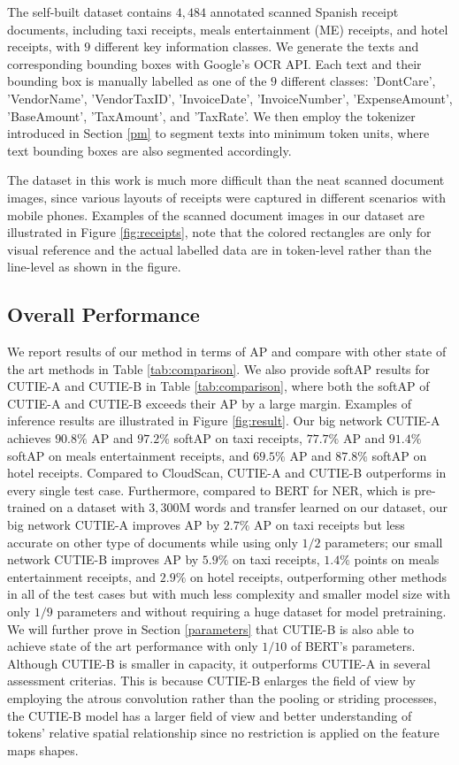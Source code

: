 \documentclass[10pt,twocolumn,letterpaper]{article}
\begin{document}
The self-built dataset contains $4,484$ annotated scanned Spanish receipt documents, including taxi receipts, meals entertainment (ME) receipts, and hotel receipts, with $9$ different key information classes. We generate the texts and corresponding bounding boxes with Google's OCR API. Each text and their bounding box is manually labelled as one of the $9$ different classes: 'DontCare', 'VendorName', 'VendorTaxID', 'InvoiceDate', 'InvoiceNumber', 'ExpenseAmount', 'BaseAmount', 'TaxAmount', and 'TaxRate'. We then employ the tokenizer introduced in Section \ref{pm} to segment texts into minimum token units, where text bounding boxes are also segmented accordingly. 

The dataset in this work is much more difficult than the neat scanned document images, since various layouts of receipts were captured in different scenarios with mobile phones. Examples of the scanned document images in our dataset are illustrated in Figure \ref{fig:receipts}, note that the colored rectangles are only for visual reference and the actual labelled data are in token-level rather than the line-level as shown in the figure.

\subsection{Overall Performance}
We report results of our method in terms of AP and compare with other state of the art methods in Table \ref{tab:comparison}. We also provide softAP results for CUTIE-A and CUTIE-B in Table \ref{tab:comparison}, where both the softAP of CUTIE-A and CUTIE-B exceeds their AP by a large margin.  Examples of inference results are illustrated in Figure \ref{fig:result}. Our big network CUTIE-A achieves $90.8\%$ AP and $97.2\%$ softAP on taxi receipts, $77.7\%$ AP and $91.4\%$ softAP on meals entertainment receipts, and $69.5\%$ AP and $87.8\%$ softAP on hotel receipts. Compared to CloudScan, CUTIE-A and CUTIE-B outperforms in every single test case. Furthermore, compared to BERT for NER, which is pre-trained on a dataset with $3,300$M words and transfer learned on our dataset, our big network CUTIE-A improves AP by $2.7\%$ AP on taxi receipts but less accurate on other type of documents while using only $1/2$ parameters; our small network CUTIE-B improves AP by $5.9\%$ on taxi receipts, $1.4\%$ points on meals entertainment receipts, and $2.9\%$ on hotel receipts, outperforming other methods in all of the test cases but with much less complexity and smaller model size with only $1/9$ parameters and without requiring a huge dataset for model pretraining. We will further prove in Section \ref{parameters} that CUTIE-B is also able to achieve state of the art performance with only $1/10$ of BERT's parameters. Although CUTIE-B is smaller in capacity, it outperforms CUTIE-A in several assessment criterias. This is because CUTIE-B enlarges the field of view by employing the atrous convolution rather than the pooling or striding processes, the CUTIE-B model has a larger field of view and better understanding of tokens' relative spatial relationship since no restriction is applied on the feature maps shapes. 
\end{document}
